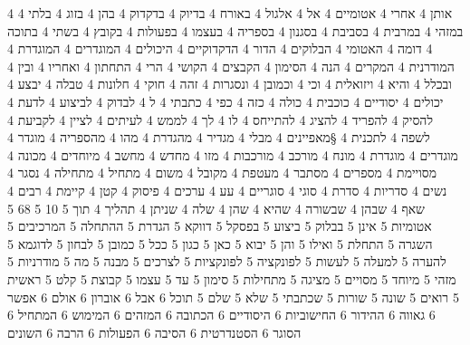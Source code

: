       4 אותן
      4 אחרי
      4 אטומיים
      4 אל
      4 אלגול
      4 באורח
      4 בדיוק
      4 בדקדוק
      4 בהן
      4 בזוג
      4 בלתי
      4 במזהי
      4 במרבית
      4 בסביבת
      4 בסגנון
      4 בספריה
      4 בעצמו
      4 בפעולות
      4 בקובץ
      4 בשתי
      4 בתוכה
      4 דומה
      4 האטומי
      4 הבלוקים
      4 הדור
      4 הדקדוקיים
      4 היכולים
      4 המוגדרים
      4 המוגדרת
      4 המודרנית
      4 המקרים
      4 הנה
      4 הסימון
      4 הקבצים
      4 הקושי
      4 הרי
      4 התחתון
      4 ואחריו
      4 ובין
      4 ובכלל
      4 והיא
      4 ויזואלית
      4 וכי
      4 וכמובן
      4 ונסגרות
      4 זהה
      4 חוקי
      4 חלונות
      4 טבלה
      4 יבצע
      4 יכולים
      4 יסודיים
      4 כוכבית
      4 כולה
      4 כזה
      4 כפי
      4 כתבתי
      4 ל
      4 לבדוק
      4 לביצוע
      4 לדעת
      4 להסיק
      4 להפריד
      4 להציג
      4 להתייחס
      4 לו
      4 לך
      4 לממש
      4 לעיתים
      4 לציין
      4 לקביעת
      4 לשפה
      4 לתכנית
      4 §מאפיינים
      4 מבלי
      4 מגדיר
      4 מהגדרת
      4 מהו
      4 מהספריה
      4 מוגדר
      4 מוגדרים
      4 מוגדרת
      4 מונח
      4 מורכב
      4 מורכבות
      4 מזו
      4 מחדש
      4 מחשב
      4 מיוחדים
      4 מכונה
      4 מסויימת
      4 מספרים
      4 מסתבר
      4 מעטפת
      4 מקובל
      4 משום
      4 מתחיל
      4 מתחילה
      4 נסגר
      4 נשים
      4 סדריות
      4 סדרת
      4 סוגי
      4 סוגריים
      4 עע
      4 ערכים
      4 פיסוק
      4 קטן
      4 קיימת
      4 רבים
      4 שאף
      4 שבהן
      4 שבשורה
      4 שהיא
      4 שהן
      4 שלה
      4 שניתן
      4 תהליך
      4 תוך
      5 10
      5 68
      5 אטומיות
      5 אינן
      5 בבלוק
      5 ביצוע
      5 בפסקל
      5 דווקא
      5 הגדרת
      5 ההתחלה
      5 המרכיבים
      5 השגרה
      5 התחלת
      5 ואילו
      5 והן
      5 יבוא
      5 כאן
      5 כגון
      5 ככל
      5 כמובן
      5 לבחון
      5 לדוגמא
      5 להערה
      5 למעלה
      5 לעשות
      5 לפונקציה
      5 לפונקציות
      5 לצרכים
      5 מבנה
      5 מה
      5 מודרניות
      5 מזהי
      5 מיוחד
      5 מסויים
      5 מציגה
      5 מתחילות
      5 סימון
      5 עד
      5 עצמו
      5 קבוצת
      5 קלט
      5 ראשית
      5 רואים
      5 שונה
      5 שורות
      5 שכתבתי
      5 שלא
      5 שלם
      5 תוכל
      6 אבל
      6 אוברון
      6 אולם
      6 אפשר
      6 גאווה
      6 ההידור
      6 החישוביות
      6 היסודיים
      6 הכתובה
      6 המזהים
      6 המימוש
      6 המתחיל
      6 הסוגר
      6 הסטנדרטית
      6 הסיבה
      6 הפעולות
      6 הרבה
      6 השונים
